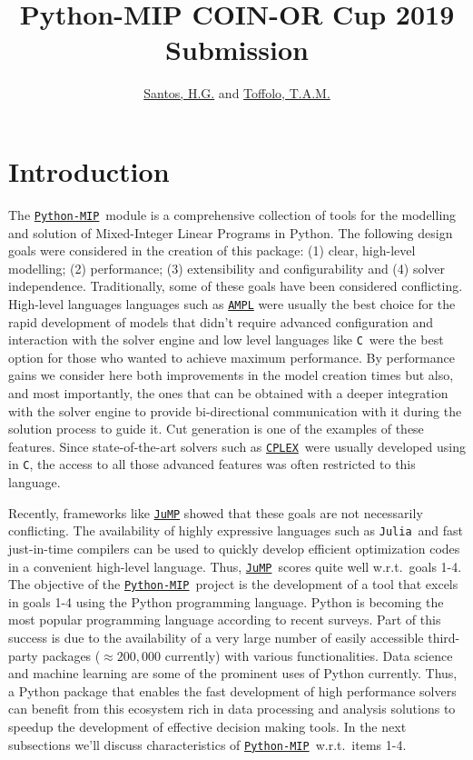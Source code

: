 \documentclass{article}
\title{Python-MIP COIN-OR Cup 2019 Submission }
\author{\href{http://www.decom.ufop.br/haroldo/}{Santos, H.G.} and \href{http://www.decom.ufop.br/toffolo}{Toffolo, T.A.M.}}
\def\C{\texttt{C}}
\def\CPLEX{\href{https://www.ibm.com/analytics/cplex-optimizer}{\texttt{CPLEX}\textsuperscript{\textregistered}}}
\def\JuMP{\href{https://github.com/JuliaOpt/JuMP.jl}{\texttt{JuMP}}}
\def\Julia{\texttt{Julia}}
\def\PythonMIP{\href{https://github.com/coin-or/python-mip}{\texttt{Python-MIP}}}
\def\AMPL{\href{https://ampl.com}{\texttt{AMPL}}}
\begin{document}
\maketitle

\section{Introduction}

The \PythonMIP\ module is a comprehensive collection of tools for the modelling and solution of Mixed-Integer Linear Programs in Python. The following design goals were considered in the creation of this package: (1) clear, high-level modelling; (2) performance; (3) extensibility and configurability and (4) solver independence.
Traditionally, some of these goals have been considered conflicting. High-level languages languages such as \AMPL \cite{Fourer1987} were usually the best choice for the rapid development of models that didn't require advanced configuration and interaction with the solver engine and low level languages like \C\ were the best option for those who wanted to achieve maximum performance. By performance gains we consider here both improvements in the model creation times but also, and most importantly, the ones that can be obtained with a deeper integration with the solver engine to provide bi-directional communication with it during the solution process to guide it. Cut generation is one of the  examples of these features. Since state-of-the-art solvers such as \CPLEX\ were usually developed using in \texttt{C}\cite{Bixby2002}, the access to all those advanced features was often restricted to this language. 

Recently, frameworks like \JuMP \cite{Dunning2015} showed that these goals are not necessarily conflicting. The availability of highly expressive languages such as \Julia\ and fast just-in-time compilers can be used to quickly develop efficient optimization codes in a convenient high-level language. Thus, \JuMP\ scores quite well w.r.t.\ goals 1-4. The objective of the \PythonMIP\ project is the development of a tool that excels in goals 1-4 using the Python programming language. Python is becoming the most popular\cite{Econ2018} programming language according to recent surveys. Part of this success is due to the availability of a very large number of easily accessible third-party packages ($\approx 200,000$ currently) with various functionalities. Data science and machine learning are some of the prominent uses of Python currently. Thus, a Python package that enables the fast development of high performance solvers can benefit from this ecosystem rich in data processing and analysis solutions to speedup the development of effective decision making tools. In the next subsections we'll discuss characteristics of \PythonMIP\ w.r.t.\ items 1-4.
\end{document}
